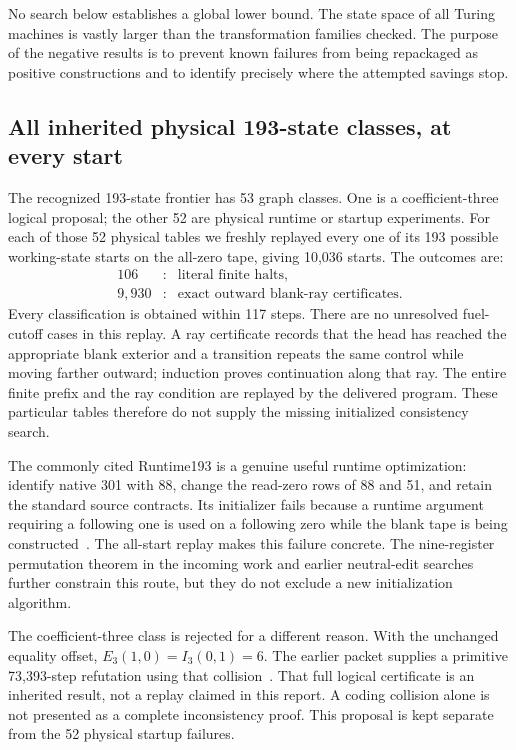 \documentclass[11pt,letterpaper]{article}
\begin{document}
No search below establishes a global lower bound. The state space of all
Turing machines is vastly larger than the transformation families checked.
The purpose of the negative results is to prevent known failures from
being repackaged as positive constructions and to identify precisely where
the attempted savings stop.

\subsection{All inherited physical 193-state classes, at every start}

The recognized 193-state frontier has 53 graph classes. One is a
coefficient-three logical proposal; the other 52 are physical runtime or
startup experiments. For each of those 52 physical tables we freshly
replayed every one of its 193 possible working-state starts on the all-zero
tape, giving 10,036 starts. The outcomes are:
\[
 \begin{array}{rcl}
 106&:&\text{literal finite halts},\\
 9,930&:&\text{exact outward blank-ray certificates}.
 \end{array}
\]
Every classification is obtained within 117 steps. There are no unresolved
fuel-cutoff cases in this replay. A ray certificate records that the head
has reached the appropriate blank exterior and a transition repeats the
same control while moving farther outward; induction proves continuation
along that ray. The entire finite prefix and the ray condition are replayed
by the delivered program. These particular tables therefore do not supply
the missing initialized consistency search.

The commonly cited Runtime193 is a genuine useful runtime optimization:
identify native 301 with 88, change the read-zero rows of 88 and 51, and
retain the standard source contracts. Its initializer fails because a
runtime argument requiring a following one is used on a following zero
while the blank tape is being constructed~\cite{runtime193}. The all-start
replay makes this failure concrete. The nine-register permutation theorem
in the incoming work and earlier neutral-edit searches further constrain
this route, but they do not exclude a new initialization algorithm.

The coefficient-three class is rejected for a different reason. With the
unchanged equality offset, $E_3(1,0)=I_3(0,1)=6$. The earlier packet supplies
a primitive 73,393-step refutation using that collision~\cite{reduction-study}.
That full logical certificate is an inherited result, not a replay claimed
in this report. A coding collision alone is not presented as a complete
inconsistency proof. This proposal is kept separate from the 52 physical
startup failures.
\end{document}

